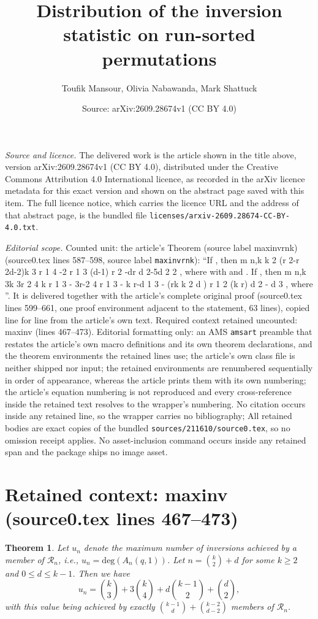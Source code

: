 \documentclass[10pt,a4paper]{amsart}
\title[Distribution of the inversion statistic on run-sorted permutations]{Distribution of the inversion statistic on run-sorted permutations}
\author{Toufik Mansour, Olivia Nabawanda, Mark Shattuck}
\date{Source: arXiv:2609.28674v1 (CC BY 4.0)}
\theoremstyle{plain}
\newtheorem{theorem}{Theorem}[section]
\begin{document}
\maketitle

\noindent\emph{Source and licence.} The delivered work is the article shown in the title above, version arXiv:2609.28674v1 (CC BY 4.0), distributed under the Creative Commons Attribution 4.0 International licence, as recorded in the arXiv licence metadata for this exact version and shown on the abstract page saved with this item. The full licence notice, which carries the licence URL and the address of that abstract page, is the bundled file \texttt{licenses/arxiv-2609.28674-CC-BY-4.0.txt}.
\par\smallskip

\noindent\textit{Editorial scope.} Counted unit: the article's Theorem (source label maxinvrnk) (source0.tex lines 587--598, source label \texttt{maxinvrnk}): ``If , then m n,k k 2 (r 2-r 2d-2)k 3 r 1 4 -2 r 1 3 (d-1) r 2 -dr d 2-5d 2 2 , where with and . If , then m n,k 3k 3r 2 4 k r 1 3 - 3r-2 4 r 1 3 - k r-d 1 3 - (rk k 2 d ) r 1 2 (k r) d 2 - d 3 , where ''. It is delivered together with the article's complete original proof (source0.tex lines 599--661, one proof environment adjacent to the statement, 63 lines), copied line for line from the article's own text. Required context retained uncounted: maxinv (lines 467--473). Editorial formatting only: an AMS \texttt{amsart} preamble that restates the article's own macro definitions and its own theorem declarations, and the theorem environments the retained lines use; the article's own class file is neither shipped nor input; the retained environments are renumbered sequentially in order of appearance, whereas the article prints them with its own numbering; the article's equation numbering is not reproduced and every cross-reference inside the retained text resolves to the wrapper's numbering. No citation occurs inside any retained line, so the wrapper carries no bibliography; All retained bodies are exact copies of the bundled \texttt{sources/211610/source0.tex}, so no omission receipt applies. No asset-inclusion command occurs inside any retained span and the package ships no image asset.


\section*{Retained context: maxinv (source0.tex lines 467--473)}

\begin{theorem}\label{maxinv}
Let $u_n$ denote the maximum number of inversions achieved by a member of $\mathcal{R}_n$, i.e., $u_n=\text{deg}(A_n(q,1))$.  Let $n=\binom{k}{2}+d$ for some $k \geq 2$ and $0 \leq d \leq k-1$.  Then we have
\begin{equation}\label{maxinve1}
u_n=\binom{k}{3}+3\binom{k}{4}+d\binom{k-1}{2}+\binom{d}{2},
\end{equation}
with this value being achieved by exactly $\binom{k-1}{d}+\binom{k-2}{d-2}$ members of $\mathcal{R}_n$.
\end{theorem}
\end{document}
